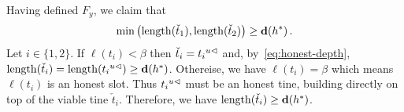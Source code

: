     Having defined $F_y$, we claim that 
    \begin{equation}\label{eq:two-long-tines}
        \min\left(\length(\check{t}_1), \length(\check{t}_2) \right) \geq \hdepth(h^*)
        \,.
    \end{equation}
    Let $i \in \{1,2\}$.
    If $\ell(t_i) < \beta$ then $\check{t}_i = \cut{u}{t_i}$ and,
    by~\eqref{eq:honest-depth}, $\length(\check{t}_i) = \length(\cut{u}{t_i}) \geq \hdepth(h^*)$. 
    Othereise, we have $\ell(t_i) = \beta$ which means 
    $\ell(t_i)$ is an honest slot. 
    Thus $\cut{u}{t_i}$ must be an honest tine, 
    building directly on top of the viable tine $\check{t}_i$. 
    Therefore, we have $\length(\check{t}_i) \geq \hdepth(h^*)$.


